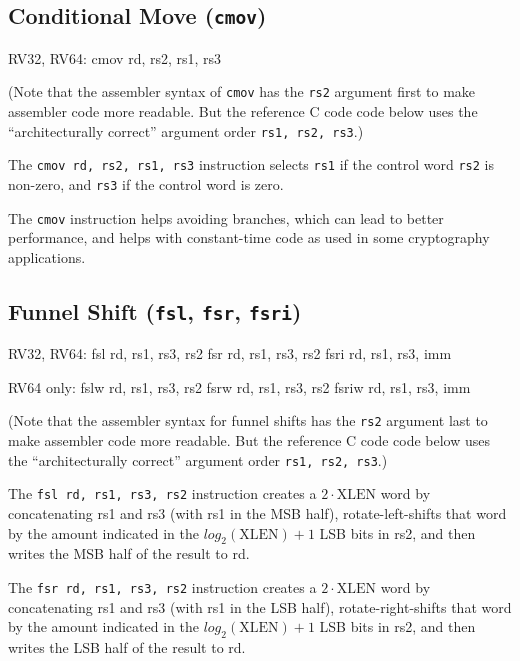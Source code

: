 \subsection{Conditional Move ({\tt cmov})}

\begin{rvb}
  RV32, RV64:
    cmov rd, rs2, rs1, rs3
\end{rvb}

(Note that the assembler syntax of {\tt cmov} has the {\tt rs2} argument first
to make assembler code more readable. But the reference C code code below uses
the ``architecturally correct'' argument order {\tt rs1, rs2, rs3}.)

The {\tt cmov rd, rs2, rs1, rs3} instruction selects {\tt rs1} if the control
word {\tt rs2} is non-zero, and {\tt rs3} if the control word is zero.



The {\tt cmov} instruction helps avoiding branches, which can lead to better
performance, and helps with constant-time code as used in some cryptography
applications.

\subsection{Funnel Shift ({\tt fsl}, {\tt fsr}, {\tt fsri})}

\begin{rvb}
  RV32, RV64:
    fsl  rd, rs1, rs3, rs2
    fsr  rd, rs1, rs3, rs2
    fsri rd, rs1, rs3, imm

  RV64 only:
    fslw  rd, rs1, rs3, rs2
    fsrw  rd, rs1, rs3, rs2
    fsriw rd, rs1, rs3, imm
\end{rvb}

(Note that the assembler syntax for funnel shifts has the {\tt rs2} argument
last to make assembler code more readable. But the reference C code code below
uses the ``architecturally correct'' argument order {\tt rs1, rs2, rs3}.)

The {\tt fsl rd, rs1, rs3, rs2} instruction creates a $2\cdot\textrm{XLEN}$ word
by concatenating rs1 and rs3 (with rs1 in the MSB half), rotate-left-shifts that
word by the amount indicated in the $log_2(\textrm{XLEN})+1$ LSB bits in rs2, and
then writes the MSB half of the result to rd.

The {\tt fsr rd, rs1, rs3, rs2} instruction creates a $2\cdot\textrm{XLEN}$ word
by concatenating rs1 and rs3 (with rs1 in the LSB half), rotate-right-shifts that
word by the amount indicated in the $log_2(\textrm{XLEN})+1$ LSB bits in rs2, and
then writes the LSB half of the result to rd.

